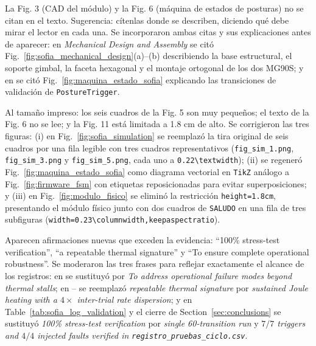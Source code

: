 \documentclass{LabDSTresponse}
\begin{document}
{La Fig. 3 (CAD del módulo) y la Fig. 6 (máquina de estados de posturas) no se citan en el texto. Sugerencia: cítenlas donde se describen, diciendo qué debe mirar el lector en cada una.}
{Se incorporaron ambas citas y sus explicaciones antes de aparecer: en \textit{Mechanical Design and Assembly} se citó Fig.~\ref{fig:sofia_mechanical_design}(a)--(b) describiendo la base estructural, el soporte gimbal, la faceta hexagonal y el montaje ortogonal de los dos MG90S; y en  se citó Fig.~\ref{fig:maquina_estado_sofia} explicando las transiciones de validación de \texttt{PostureTrigger}.}

{Al tamaño impreso: los seis cuadros de la Fig. 5 son muy pequeños; el texto de la Fig. 6 no se lee; y la Fig. 11 está limitada a 1.8 cm de alto.}
{Se corrigieron las tres figuras: (i) en Fig.~\ref{fig:sofia_simulation} se reemplazó la tira original de seis cuadros por una fila legible con tres cuadros representativos (\texttt{fig\_sim\_1.png}, \texttt{fig\_sim\_3.png} y \texttt{fig\_sim\_5.png}, cada uno a \texttt{0.22\textbackslash textwidth}); (ii) se regeneró Fig.~\ref{fig:maquina_estado_sofia} como diagrama vectorial en \texttt{TikZ} análogo a Fig.~\ref{fig:firmware_fsm} con etiquetas reposicionadas para evitar superposiciones; y (iii) en Fig.~\ref{fig:modulo_fisico} se eliminó la restricción \texttt{height=1.8cm}, presentando el módulo físico junto con dos cuadros de \texttt{SALUDO} en una fila de tres subfiguras (\texttt{width=0.23\textbackslash columnwidth,keepaspectratio}).}


{Aparecen afirmaciones nuevas que exceden la evidencia: “100\% stress-test verification”, “a repeatable thermal signature” y “To ensure complete operational robustness”.}
{Se moderaron las tres frases para reflejar exactamente el alcance de los registros: en  se sustituyó por \textit{To address operational failure modes beyond thermal stalls}; en -- se reemplazó \textit{repeatable thermal signature} por \textit{sustained Joule heating with a $4\times$ inter-trial rate dispersion}; y en Table~\ref{tab:sofia_log_validation} y el cierre de Section~\ref{sec:conclusions} se sustituyó \textit{100\% stress-test verification} por \textit{single 60-transition run} y \textit{$7/7$ triggers and $4/4$ injected faults verified in \texttt{registro\_pruebas\_ciclo.csv}}.}
\end{document}
